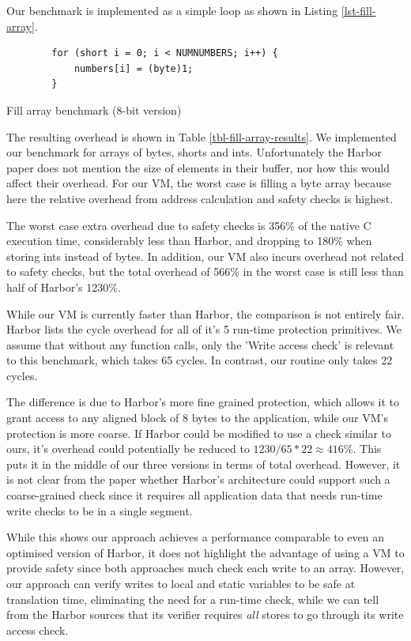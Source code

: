 Our benchmark is implemented as a simple loop as shown in Listing \ref{lst-fill-array}.

\begin{listing}[]
	\centering
 	\begin{verbatim}
        for (short i = 0; i < NUMNUMBERS; i++) {
            numbers[i] = (byte)1;
        }
	\end{verbatim}
	\caption{Fill array benchmark (8-bit version)}
	\label{lst-fill-array}
\end{listing}



The resulting overhead is shown in Table \ref{tbl-fill-array-results}. We implemented our benchmark for arrays of bytes, shorts and ints. Unfortunately the Harbor paper does not mention the size of elements in their buffer, nor how this would affect their overhead. For our VM, the worst case is filling a byte array because here the relative overhead from address calculation and safety checks is highest.

The worst case extra overhead due to safety checks is 356\% of the native C execution time, considerably less than Harbor, and dropping to 180\% when storing ints instead of bytes. In addition, our VM also incurs overhead not related to safety checks, but the total overhead of 566\% in the worst case is still less than half of Harbor's 1230\%.

While our VM is currently faster than Harbor, the comparison is not entirely fair. Harbor lists the cycle overhead for all of it's 5 run-time protection primitives. We assume that without any function calls, only the 'Write access check' is relevant to this benchmark, which takes 65 cycles. In contrast, our  routine only takes 22 cycles.

The difference is due to Harbor's more fine grained protection, which allows it to grant access to any aligned block of 8 bytes to the application, while our VM's protection is more coarse. If Harbor could be modified to use a check similar to ours, it's overhead could potentially be reduced to $1230 / 65 * 22 \approx 416\%$. This puts it in the middle of our three versions in terms of total overhead. However, it is not clear from the paper whether Harbor's architecture could support such a coarse-grained check since it requires all application data that needs run-time write checks to be in a single segment.

 While this shows our approach achieves a performance comparable to even an optimised version of Harbor, it does not highlight the advantage of using a VM to provide safety since both approaches much check each write to an array. However, our approach can verify writes to local and static variables to be safe at translation time, eliminating the need for a run-time check, while we can tell from the Harbor sources \cite{sos-operating-system} that its verifier requires \emph{all} stores to go through its write access check.

